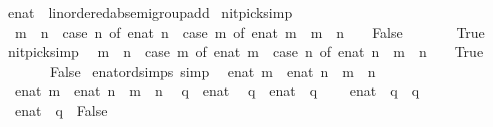\begin{isabellebody}
\ enat\ {\isacharcolon}{\isacharcolon}\ linordered{\isacharunderscore}ab{\isacharunderscore}semigroup{\isacharunderscore}add\isanewline
{}\isanewline
\isanewline
{}\isamarkupfalse%
\ {\isacharbrackleft}nitpick{\isacharunderscore}simp{\isacharbrackright}{\isacharcolon}\isanewline
\ \ {\isachardoublequoteopen}m\ {\isasymle}\ n\ {\isacharequal}\ {\isacharparenleft}case\ n\ of\ enat\ n{}\ {\isasymRightarrow}\ {\isacharparenleft}case\ m\ of\ enat\ m{}\ {\isasymRightarrow}\ m{}\ {\isasymle}\ n{}\ {\isacharbar}\ {\isasyminfinity}\ {\isasymRightarrow}\ False{\isacharparenright}\isanewline
\ \ \ \ {\isacharbar}\ {\isasyminfinity}\ {\isasymRightarrow}\ True{\isacharparenright}{\isachardoublequoteclose}\isanewline
\isanewline
{}\isamarkupfalse%
\ {\isacharbrackleft}nitpick{\isacharunderscore}simp{\isacharbrackright}{\isacharcolon}\isanewline
\ \ {\isachardoublequoteopen}m\ {\isacharless}\ n\ {\isacharequal}\ {\isacharparenleft}case\ m\ of\ enat\ m{}\ {\isasymRightarrow}\ {\isacharparenleft}case\ n\ of\ enat\ n{}\ {\isasymRightarrow}\ m{}\ {\isacharless}\ n{}\ {\isacharbar}\ {\isasyminfinity}\ {\isasymRightarrow}\ True{\isacharparenright}\isanewline
\ \ \ \ {\isacharbar}\ {\isasyminfinity}\ {\isasymRightarrow}\ False{\isacharparenright}{\isachardoublequoteclose}\isanewline
\isanewline
{}\isamarkupfalse%
\ enat{\isacharunderscore}ord{\isacharunderscore}simps\ {\isacharbrackleft}simp{\isacharbrackright}{\isacharcolon}\isanewline
\ \ {\isachardoublequoteopen}enat\ m\ {\isasymle}\ enat\ n\ {\isasymlongleftrightarrow}\ m\ {\isasymle}\ n{\isachardoublequoteclose}\isanewline
\ \ {\isachardoublequoteopen}enat\ m\ {\isacharless}\ enat\ n\ {\isasymlongleftrightarrow}\ m\ {\isacharless}\ n{\isachardoublequoteclose}\isanewline
\ \ {\isachardoublequoteopen}q\ {\isasymle}\ {\isacharparenleft}{\isasyminfinity}{\isacharcolon}{\isacharcolon}enat{\isacharparenright}{\isachardoublequoteclose}\isanewline
\ \ {\isachardoublequoteopen}q\ {\isacharless}\ {\isacharparenleft}{\isasyminfinity}{\isacharcolon}{\isacharcolon}enat{\isacharparenright}\ {\isasymlongleftrightarrow}\ q\ {\isasymnoteq}\ {\isasyminfinity}{\isachardoublequoteclose}\isanewline
\ \ {\isachardoublequoteopen}{\isacharparenleft}{\isasyminfinity}{\isacharcolon}{\isacharcolon}enat{\isacharparenright}\ {\isasymle}\ q\ {\isasymlongleftrightarrow}\ q\ {\isacharequal}\ {\isasyminfinity}{\isachardoublequoteclose}\isanewline
\ \ {\isachardoublequoteopen}{\isacharparenleft}{\isasyminfinity}{\isacharcolon}{\isacharcolon}enat{\isacharparenright}\ {\isacharless}\ q\ {\isasymlongleftrightarrow}\ False{\isachardoublequoteclose}\isanewline

\end{isabellebody}
